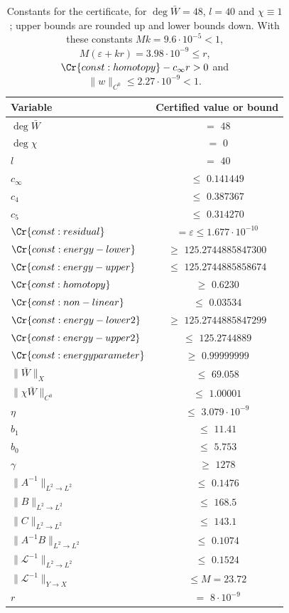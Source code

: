 \begin{table}[H]
\centering
\begin{tabular}{lc}
\toprule
Variable & Certified value or bound\\
\midrule
$\deg\bar W$ & $=$ $48$\\
$\deg\chi$ & $=$ $0$\\
$l$ & $=$ $40$\\
$c_\infty$ & $\le$ $0.141449$\\
$c_4$ & $\le$ $0.387367$\\
$c_5$ & $\le$ $0.314270$\\
$\Cr{const:residual}$ & $=\varepsilon\le 1.677\cdot 10^{-10}$\\
$\Cr{const:energy-lower}$ & $\ge$ $125.2744885847300$\\
$\Cr{const:energy-upper}$ & $\le$ $125.2744885858674$\\
$\Cr{const:homotopy}$ & $\ge$ $0.6230$\\
$\Cr{const:non-linear}$ & $\le$ $0.03534$\\
$\Cr{const:energy-lower2}$ & $\ge$ $125.2744885847299$\\
$\Cr{const:energy-upper2}$ & $\le$ $125.2744889$\\
$\Cr{const:energyparameter}$ & $\ge$ $0.99999999$\\
$\|\bar W\|_X$ & $\le$ $69.058$\\
$\|\chi\bar W\|_{C^0}$ & $\le$ $1.00001$\\
$\eta$ & $\le$ $3.079\cdot 10^{-9}$\\
$b_1$ & $\le$ $11.41$\\
$b_0$ & $\le$ $5.753$\\
$\gamma$ & $\ge$ $1278$\\
$\|A^{-1}\|_{L^2\to L^2}$ & $\le$ $0.1476$\\
$\|B\|_{L^2\to L^2}$ & $\le$ $168.5$\\
$\|C\|_{L^2\to L^2}$ & $\le$ $143.1$\\
$\|A^{-1}B\|_{L^2\to L^2}$ & $\le$ $0.1074$\\
$\|\mathscr L^{-1}\|_{L^2\to L^2}$ & $\le$ $0.1524$\\
$\|\mathscr L^{-1}\|_{Y\to X}$ & $\le M=23.72$\\
$r$ & $=$ $8\cdot 10^{-9}$\\
\bottomrule
\end{tabular}
\caption{Constants for the certificate, for $\deg\bar W=48$, $l=40$ and $\chi\equiv 1$; upper bounds are rounded up and lower bounds down. With these constants $Mk=9.6\cdot 10^{-5}<1$, $M(\varepsilon+kr)=3.98\cdot 10^{-9}\le r$, $\Cr{const:homotopy}-c_\infty r>0$ and $\|w\|_{C^0}\le2.27\cdot 10^{-9}<1$.}
\label{master-table}
\end{table}
